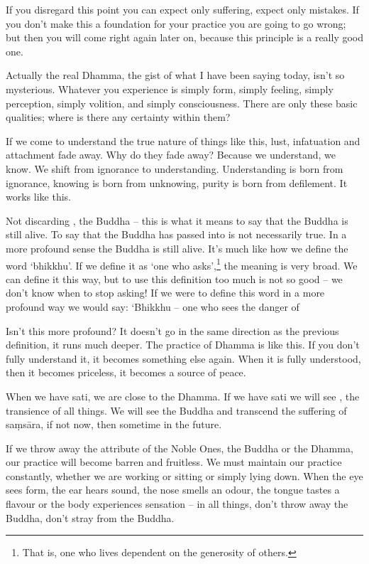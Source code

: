 If you disregard this point you can expect only suffering, expect only mistakes. If you don't make this a foundation for your practice you are going to go wrong; but then you will come right again later on, because this principle is a really good one.

Actually the real Dhamma, the gist of what I have been saying today, isn't so mysterious. Whatever you experience is simply form, simply feeling, simply perception, simply volition, and simply consciousness. There are only these basic qualities; where is there any certainty within them?

If we come to understand the true nature of things like this, lust, infatuation and attachment fade away. Why do they fade away? Because we understand, we know. We shift from ignorance to understanding. Understanding is born from ignorance, knowing is born from unknowing, purity is born from defilement. It works like this.

Not discarding , the Buddha -- this is what it means to say that the Buddha is still alive. To say that the Buddha has passed into  is not necessarily true. In a more profound sense the Buddha is still alive. It's much like how we define the word `bhikkhu'. If we define it as `one who asks',\footnote{That is, one who lives dependent on the generosity of others.} the meaning is very broad. We can define it this way, but to use this definition too much is not so good -- we don't know when to stop asking! If we were to define this word in a more profound way we would say: `Bhikkhu -- one who sees the danger of 

Isn't this more profound? It doesn't go in the same direction as the previous definition, it runs much deeper. The practice of Dhamma is like this. If you don't fully understand it, it becomes something else again. When it is fully understood, then it becomes priceless, it becomes a source of peace.

When we have sati, we are close to the Dhamma. If we have sati we will see , the transience of all things. We will see the Buddha and transcend the suffering of sa\d{m}s\=ara, if not now, then sometime in the future.

If we throw away the attribute of the Noble Ones, the Buddha or the Dhamma, our practice will become barren and fruitless. We must maintain our practice constantly, whether we are working or sitting or simply lying down. When the eye sees form, the ear hears sound, the nose smells an odour, the tongue tastes a flavour or the body experiences sensation -- in all things, don't throw away the Buddha, don't stray from the Buddha.


